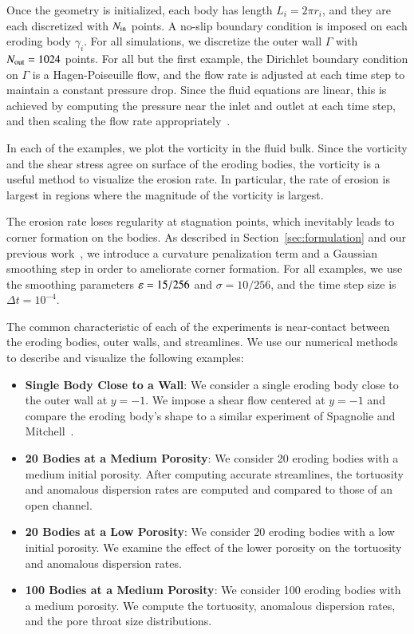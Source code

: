 \documentclass[preprint,10pt]{elsarticle}
\begin{document}
Once the geometry is initialized, each body has length $L_i = 2\pi r_i$,
and they are each discretized with $N_{\mathrm{in}}$ points.  A no-slip boundary
condition is imposed on each eroding body $\gamma_i$.  For all
simulations, we discretize the outer wall $\Gamma$ with $N_{\mathrm{out}}=1024$
points.  For all but the first example, the Dirichlet boundary condition
on $\Gamma$ is a Hagen-Poiseuille flow, and the flow rate is adjusted at
each time step to maintain a constant pressure drop. Since the fluid
equations are linear, this is achieved by computing the pressure near
the inlet and outlet at each time step, and then scaling the flow rate
appropriately~\cite{qua-moo2018}.

In each of the examples, we plot the vorticity in the fluid bulk.  Since
the vorticity and the shear stress agree on surface of the eroding
bodies, the vorticity is a useful method to visualize the erosion rate.
In particular, the rate of erosion is largest in regions where the
magnitude of the vorticity is largest.

The erosion rate loses regularity at stagnation points, which inevitably
leads to corner formation on the bodies.  As described in
Section~\ref{sec:formulation} and our previous work~\cite{qua-moo2018},
we introduce a curvature penalization term and a Gaussian smoothing step
in order to ameliorate corner formation.  For all examples, we use the
smoothing parameters $\varepsilon=15/256$ and $\sigma=10/256$, and the time
step size is $\Delta t = 10^{-4}$.

The common characteristic of each of the experiments is near-contact
between the eroding bodies, outer walls, and streamlines. We use our
numerical methods to describe and visualize the following examples:
\begin{itemize}
  \item{\bf Single Body Close to a Wall}: We consider a single eroding
  body close to the outer wall at $y=-1$.  We impose a shear flow
  centered at $y=-1$ and compare the eroding body's shape to a similar
  experiment of Spagnolie and Mitchell~\cite{mit-spa2017}.

  \item{\bf 20 Bodies at a Medium Porosity}: We consider 20 eroding
  bodies with a medium initial porosity.  After computing accurate
  streamlines, the tortuosity and anomalous dispersion rates are
  computed and compared to those of an open channel.

  \item{\bf 20 Bodies at a Low Porosity}: We consider 20 eroding bodies
  with a low initial porosity.  We examine the effect of the lower
  porosity on the tortuosity and anomalous dispersion rates.

  \item{\bf 100 Bodies at a Medium Porosity}: We consider 100 eroding
  bodies with a medium porosity.  We compute the tortuosity, anomalous
  dispersion rates, and the pore throat size distributions.
\end{itemize}
\end{document}
